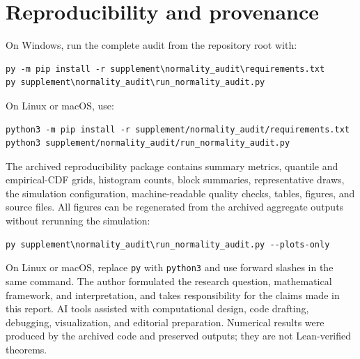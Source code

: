 \documentclass[10pt]{article}
\begin{document}
\clearpage
\section{Reproducibility and provenance}
\label{app:reproducibility}

On Windows, run the complete audit from the repository root with:
\begin{verbatim}
py -m pip install -r supplement\normality_audit\requirements.txt
py supplement\normality_audit\run_normality_audit.py
\end{verbatim}
On Linux or macOS, use:
\begin{verbatim}
python3 -m pip install -r supplement/normality_audit/requirements.txt
python3 supplement/normality_audit/run_normality_audit.py
\end{verbatim}
The archived reproducibility package contains summary metrics, quantile and
empirical-CDF grids, histogram counts, block summaries, representative draws,
the simulation configuration, machine-readable quality checks, tables,
figures, and source files.  All figures can be regenerated from the archived
aggregate outputs without rerunning the simulation:
\begin{verbatim}
py supplement\normality_audit\run_normality_audit.py --plots-only
\end{verbatim}
On Linux or macOS, replace \texttt{py} with \texttt{python3} and use forward
slashes in the same command.
\medskip
\noindent
The author formulated the research question, mathematical framework, and
interpretation, and takes responsibility for the claims made in this report.
AI tools assisted with computational design, code drafting, debugging,
visualization, and editorial preparation.  Numerical results were produced by
the archived code and preserved outputs; they are not Lean-verified theorems.
\end{document}
